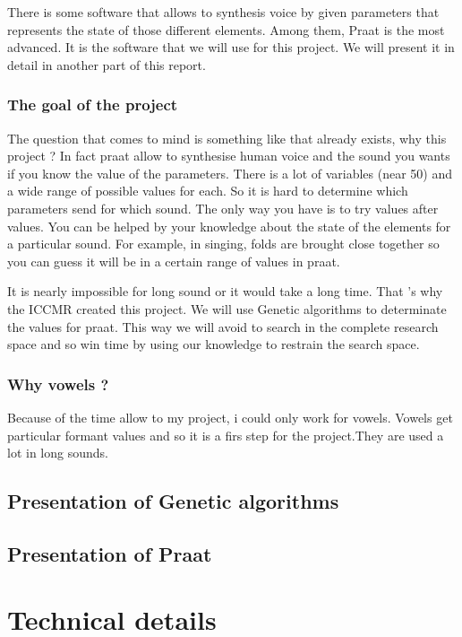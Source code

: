 \documentclass[12pt]{report}
\begin{document}
There is some software that allows to synthesis voice by given parameters that represents the state of those different elements. Among them, Praat \cite{ref1} is the most advanced.
It is the software that we will use for this project. We will present it in detail in another part of this report.

\section{The goal of the project}
The question that comes to mind is something like that already exists, why this project ?
In fact praat allow to synthesise human voice and the sound you wants if you know the value of the parameters. There is a lot of variables (near 50) and a wide range of possible values for each. So it is hard to determine which parameters send for which sound. The only way you have is to try values after values. You can be helped by your knowledge about the state of the elements for a particular sound. For example, in singing, folds are brought close together so you can guess it will be in a certain range of values in praat.

It is nearly impossible for long sound or it would take a long time. That 's why the ICCMR created this project. We will use Genetic algorithms to determinate the values for praat. This way we will avoid to search in the complete research space and so win time by using our knowledge to restrain the search space.

\section{Why vowels ?}
Because of the time allow to my project, i could only work for vowels. Vowels get particular formant values and so it is a firs step for the project.They are used a lot in long sounds.

\chapter{Presentation of Genetic algorithms}

\chapter{Presentation of Praat}

\part{Technical details}
\end{document}
